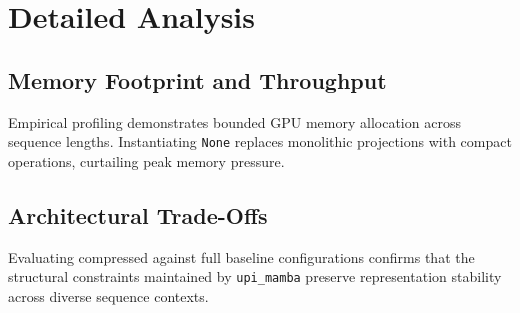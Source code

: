 \section{Detailed Analysis}

\subsection{Memory Footprint and Throughput}
Empirical profiling demonstrates bounded GPU memory allocation across sequence lengths. Instantiating \texttt{None} replaces monolithic projections with compact operations, curtailing peak memory pressure.

\subsection{Architectural Trade-Offs}
Evaluating compressed against full baseline configurations confirms that the structural constraints maintained by \texttt{upi_mamba} preserve representation stability across diverse sequence contexts.
